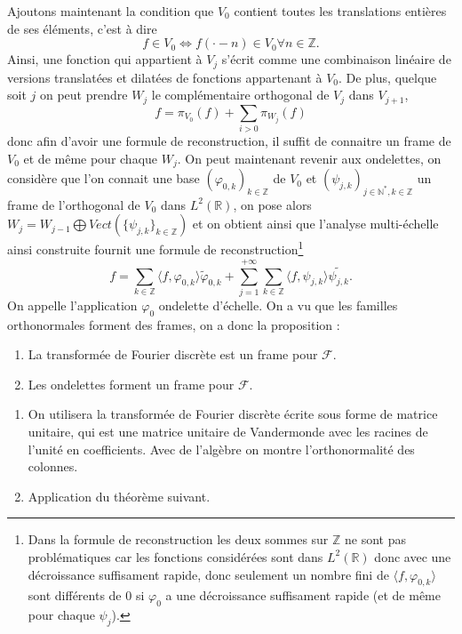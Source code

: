 Ajoutons maintenant la condition que $V_0$ contient toutes les translations entières de ses éléments, c'est à dire
\begin{equation}
	f \in V_0 \iff f(\cdot - n) \in V_0 \forall n \in \mathbb{Z}.
\end{equation}
Ainsi, une fonction qui appartient à $V_j$ s'écrit comme une combinaison linéaire de versions translatées et dilatées de fonctions appartenant à $V_0$.
De plus, quelque soit $j$ on peut prendre $W_j$ le complémentaire orthogonal de $V_j$ dans $V_{j+1}$, 
\begin{equation}
	f = \pi_{V_0}(f) +\sum_{i>0} \pi_{W_j}(f) 
\end{equation}
donc afin d'avoir une formule de reconstruction, il suffit de connaitre un frame de $V_0$ et de même pour chaque $W_j$. 
On peut maintenant revenir aux ondelettes, on considère que l'on connait une base $(\varphi_{0,k})_{k\in \mathbb{Z}}$ de $V_0$ et $(\psi_{j,k})_{j\in \mathbb{N}^*, k \in \mathbb{Z}}$ un frame de l'orthogonal de $V_0$ dans $L^2(\mathbb{R})$, on pose alors $W_j = W_{j-1} \bigoplus Vect(\{\psi_{j,k}\}_{k\in \mathbb{Z}})$ et on obtient ainsi que l'analyse multi-échelle ainsi construite fournit une formule de reconstruction\footnote{Dans la formule de reconstruction les deux sommes sur $\mathbb{Z}$ ne sont pas problématiques car les fonctions considérées sont dans $L^2(\mathbb{R})$ donc avec une décroissance suffisament rapide, donc seulement un nombre fini de $\langle f, \varphi_{0,k} \rangle$ sont différents de 0 si $\varphi_0$ a une décroissance suffisament rapide (et de même pour chaque $\psi_j$).}
\begin{equation}
	f = \sum_{k\in \mathbb{Z}} \langle f, \varphi_{0,k} \rangle \tilde{\varphi}_{0,k} + \sum_{j = 1}^{+\infty} \sum_{k\in \mathbb{Z}} \langle f, \psi_{j,k} \rangle \tilde{\psi_{j,k}}.
\end{equation}
On appelle l'application $\varphi_0$ ondelette d'échelle.
On a vu que les familles orthonormales forment des frames, on a donc la proposition :
\begin{proposition}
	\begin{enumerate}
		\item La transformée de Fourier discrète est un frame pour $\mathcal{F}$.
		\item Les ondelettes forment un frame pour $\mathcal{F}$.
	\end{enumerate}
\end{proposition}
\begin{preuve}
	\begin{enumerate}
		\item On utilisera la transformée de Fourier discrète écrite sous forme de matrice unitaire, qui est une matrice unitaire de Vandermonde avec les racines de l'unité en coefficients. Avec de l'algèbre on montre l'orthonormalité des colonnes.
		\item Application du théorème suivant.
	\end{enumerate}
\end{preuve}


